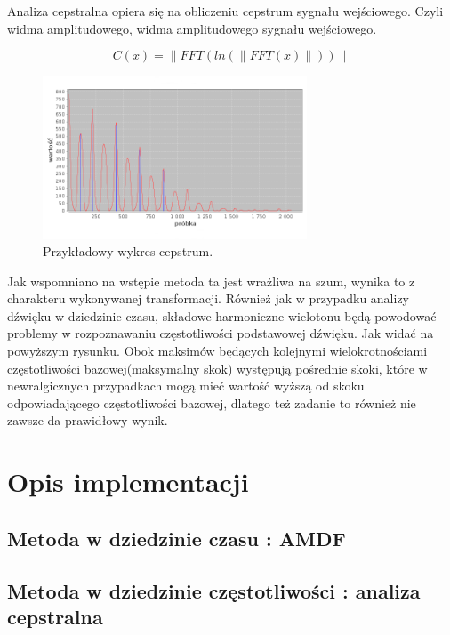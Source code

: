 \documentclass{classrep}
\begin{document}
Analiza cepstralna opiera się na obliczeniu cepstrum sygnału wejściowego. Czyli widma amplitudowego, widma amplitudowego sygnału wejściowego.

\begin{equation}
C(x) =\| FFT \left( ln \left( \| FFT(x) \| \right) \right) \|
\end{equation}


\begin{figure}[H]
  \centering
  \includegraphics[width=0.7\textwidth]{cepstrum}
  \caption{Przykładowy wykres cepstrum.}
  \label{fig_cepstrum}
\end{figure}

Jak wspomniano na wstępie metoda ta jest wrażliwa na szum, wynika to z charakteru wykonywanej transformacji. Również jak w przypadku analizy dźwięku w dziedzinie czasu, składowe harmoniczne wielotonu będą powodować problemy w rozpoznawaniu częstotliwości podstawowej dźwięku. Jak widać na powyższym rysunku. Obok maksimów będących kolejnymi wielokrotnościami częstotliwości bazowej(maksymalny skok) występują pośrednie skoki, które w newralgicznych przypadkach mogą mieć wartość wyższą od skoku odpowiadającego częstotliwości bazowej, dlatego też zadanie to również nie zawsze da prawidłowy wynik. 


\section{Opis implementacji}


\subsection{Metoda w dziedzinie czasu : AMDF}

\subsection{Metoda w dziedzinie częstotliwości : analiza cepstralna}
\end{document}
